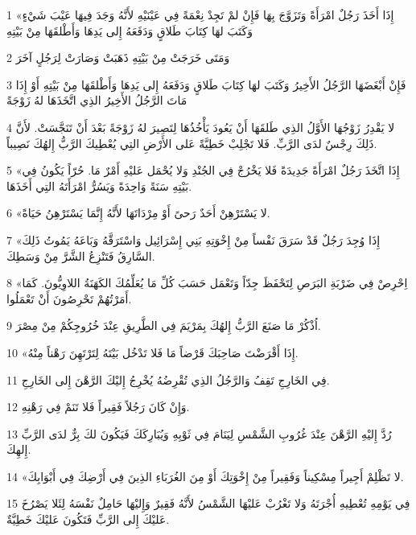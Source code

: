 \par 1 «إِذَا أَخَذَ رَجُلٌ امْرَأَةً وَتَزَوَّجَ بِهَا فَإِنْ لمْ تَجِدْ نِعْمَةً فِي عَيْنَيْهِ لأَنَّهُ وَجَدَ فِيهَا عَيْبَ شَيْءٍ وَكَتَبَ لهَا كِتَابَ طَلاقٍ وَدَفَعَهُ إِلى يَدِهَا وَأَطْلقَهَا مِنْ بَيْتِهِ
\par 2 وَمَتَى خَرَجَتْ مِنْ بَيْتِهِ ذَهَبَتْ وَصَارَتْ لِرَجُلٍ آخَرَ
\par 3 فَإِنْ أَبْغَضَهَا الرَّجُلُ الأَخِيرُ وَكَتَبَ لهَا كِتَابَ طَلاقٍ وَدَفَعَهُ إِلى يَدِهَا وَأَطْلقَهَا مِنْ بَيْتِهِ أَوْ إِذَا مَاتَ الرَّجُلُ الأَخِيرُ الذِي اتَّخَذَهَا لهُ زَوْجَةً
\par 4 لا يَقْدِرُ زَوْجُهَا الأَوَّلُ الذِي طَلقَهَا أَنْ يَعُودَ يَأْخُذُهَا لِتَصِيرَ لهُ زَوْجَةً بَعْدَ أَنْ تَنَجَّسَتْ. لأَنَّ ذَلِكَ رِجْسٌ لدَى الرَّبِّ. فَلا تَجْلِبْ خَطِيَّةً عَلى الأَرْضِ التِي يُعْطِيكَ الرَّبُّ إِلهُكَ نَصِيباً.
\par 5 «إِذَا اتَّخَذَ رَجُلٌ امْرَأَةً جَدِيدَةً فَلا يَخْرُجْ فِي الجُنْدِ وَلا يُحْمَل عَليْهِ أَمْرٌ مَا. حُرّاً يَكُونُ فِي بَيْتِهِ سَنَةً وَاحِدَةً وَيَسُرُّ امْرَأَتَهُ التِي أَخَذَهَا.
\par 6 «لا يَسْتَرْهِنْ أَحَدٌ رَحىً أَوْ مِرْدَاتَهَا لأَنَّهُ إِنَّمَا يَسْتَرْهِنُ حَيَاةً.
\par 7 «إِذَا وُجِدَ رَجُلٌ قَدْ سَرَقَ نَفْساً مِنْ إِخْوَتِهِ بَنِي إِسْرَائِيل وَاسْتَرَقَّهُ وَبَاعَهُ يَمُوتُ ذَلِكَ السَّارِقُ فَتَنْزِعُ الشَّرَّ مِنْ وَسَطِكَ.
\par 8 «اِحْرِصْ فِي ضَرْبَةِ البَرَصِ لِتَحْفَظَ جِدّاً وَتَعْمَل حَسَبَ كُلِّ مَا يُعَلِّمُكَ الكَهَنَةُ اللاوِيُّونَ. كَمَا أَمَرْتُهُمْ تَحْرِصُونَ أَنْ تَعْمَلُوا.
\par 9 اُذْكُرْ مَا صَنَعَ الرَّبُّ إِلهُكَ بِمَرْيَمَ فِي الطَّرِيقِ عِنْدَ خُرُوجِكُمْ مِنْ مِصْرَ.
\par 10 «إِذَا أَقْرَضْتَ صَاحِبَكَ قَرْضاً مَا فَلا تَدْخُل بَيْتَهُ لِتَرْتَهِنَ رَهْناً مِنْهُ.
\par 11 فِي الخَارِجِ تَقِفُ وَالرَّجُلُ الذِي تُقْرِضُهُ يُخْرِجُ إِليْكَ الرَّهْنَ إِلى الخَارِجِ.
\par 12 وَإِنْ كَانَ رَجُلاً فَقِيراً فَلا تَنَمْ فِي رَهْنِهِ.
\par 13 رُدَّ إِليْهِ الرَّهْنَ عِنْدَ غُرُوبِ الشَّمْسِ لِيَنَامَ فِي ثَوْبِهِ وَيُبَارِكَكَ فَيَكُونَ لكَ بِرٌّ لدَى الرَّبِّ إِلهِكَ.
\par 14 «لا تَظْلِمْ أَجِيراً مِسْكِيناً وَفَقِيراً مِنْ إِخْوَتِكَ أَوْ مِنَ الغُرَبَاءِ الذِينَ فِي أَرْضِكَ فِي أَبْوَابِكَ.
\par 15 فِي يَوْمِهِ تُعْطِيهِ أُجْرَتَهُ وَلا تَغْرُبْ عَليْهَا الشَّمْسُ لأَنَّهُ فَقِيرٌ وَإِليْهَا حَامِلٌ نَفْسَهُ لِئَلا يَصْرُخَ عَليْكَ إِلى الرَّبِّ فَتَكُونَ عَليْكَ خَطِيَّةٌ.
